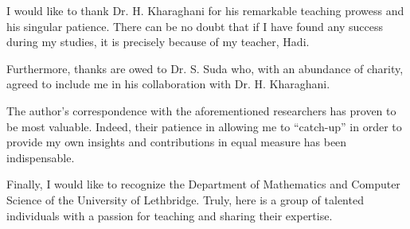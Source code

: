 \documentclass[../../main]{subfiles}
\begin{document}
 I would like to thank Dr. H. Kharaghani for his remarkable teaching prowess and his singular patience. There can be no doubt that if I have found any success during my studies, it is precisely because of my teacher, Hadi. 
 
 Furthermore, thanks are owed to Dr. S. Suda who, with an abundance of charity, agreed to include me in his collaboration with Dr. H. Kharaghani.

 The author's correspondence with the aforementioned researchers has proven to be
 most valuable. Indeed, their patience in allowing me to ``catch-up'' in order
 to provide my own insights and contributions in equal measure has been indispensable.
 
 Finally, I would like to recognize the Department of Mathematics and Computer Science of the University of Lethbridge. Truly, here is a group of talented individuals with a passion for teaching and sharing their expertise.
\end{document}
